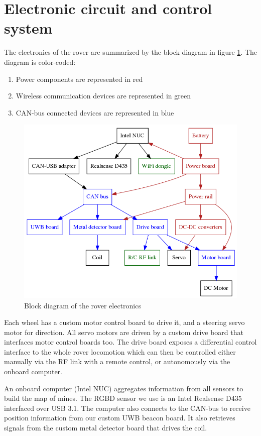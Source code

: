 \section{Electronic circuit and control system}
The electronics of the rover are summarized by the block diagram in figure \ref{fig:block-diagram}.
The diagram is color-coded:
\begin{enumerate}
    \item Power components are represented in red
    \item Wireless communication devices are represented in green
    \item CAN-bus connected devices are represented in blue
\end{enumerate}

\begin{figure}[htbp]
   \caption{\label{fig:block-diagram} Block diagram of the rover electronics}
   \includegraphics[width=\textwidth]{images/diagram}
\end{figure}

Each wheel has a custom motor control board to drive it, and a steering servo motor for direction.
All servo motors are driven by a custom drive board that interfaces motor control boards too.
The drive board exposes a differential control interface to the whole rover locomotion which can then be controlled either manually via the RF link with a remote control, or autonomously via the onboard computer.

An onboard computer (Intel NUC) aggregates information from all sensors to build the map of mines.
The RGBD sensor we use is an Intel Realsense D435 interfaced over USB 3.1.
The computer also connects to the CAN-bus to receive position information from our custom UWB beacon board.
It also retrieves signals from the custom metal detector board that drives the coil.

